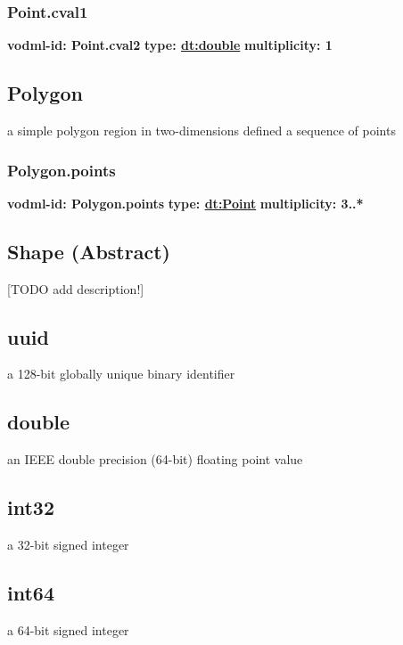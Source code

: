     \subsubsection{Point.cval1}
      \textbf{vodml-id: Point.cval2} \newline
      \textbf{type: \hyperref[sect:double]{dt:double}} \newline
      \textbf{multiplicity: 1} 

  \subsection{Polygon}
  \label{sect:Polygon}
    a simple polygon region in two-dimensions defined a sequence of points

    \subsubsection{Polygon.points}
      \textbf{vodml-id: Polygon.points} \newline
      \textbf{type: \hyperref[sect:Point]{dt:Point}} \newline
      \textbf{multiplicity: 3..*} 

  \subsection{Shape (Abstract)}
  \label{sect:Shape}
    [TODO add description!]

  \subsection{uuid}
  \label{sect:uuid}
  a 128-bit globally unique binary identifier

  \subsection{double}
  \label{sect:double}
  an IEEE double precision (64-bit) floating point value

  \subsection{int32}
  \label{sect:int32}
  a 32-bit signed integer

  \subsection{int64}
  \label{sect:int64}
  a 64-bit signed integer